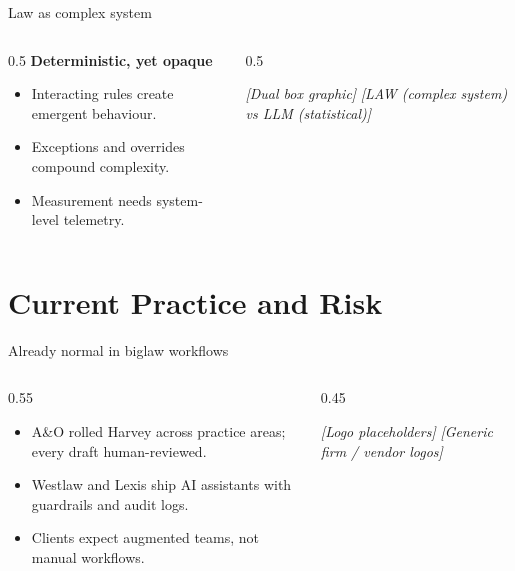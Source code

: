 \documentclass[10pt, aspectratio=169]{beamer}
\newcommand{\placeholder}[1]{\textit{[#1]}}
\begin{document}
\begin{frame}{Law as complex system}
  \begin{columns}[T]
    \begin{column}{0.5\textwidth}
      \textbf{Deterministic, yet opaque}
      \begin{itemize}
        \item Interacting rules create emergent behaviour.
        \item Exceptions and overrides compound complexity.
        \item Measurement needs system-level telemetry.
      \end{itemize}
    \end{column}
    \begin{column}{0.5\textwidth}
      \begin{block}{\placeholder{Dual box graphic}}
        \centering
        \placeholder{LAW (complex system) vs LLM (statistical)}
      \end{block}
    \end{column}
  \end{columns}
\end{frame}

\section{Current Practice and Risk}

\begin{frame}{Already normal in biglaw workflows}
  \begin{columns}[T]
    \begin{column}{0.55\textwidth}
      \begin{itemize}
        \item A\&O rolled Harvey across practice areas; every draft human-reviewed.
        \item Westlaw and Lexis ship AI assistants with guardrails and audit logs.
        \item Clients expect augmented teams, not manual workflows.
      \end{itemize}
    \end{column}
    \begin{column}{0.45\textwidth}
      \begin{block}{\placeholder{Logo placeholders}}
        \centering
        \placeholder{Generic firm / vendor logos}
      \end{block}
    \end{column}
  \end{columns}
  \vfill
  \small \parencite{reuters_harvey1,reuters_harvey2,tr_westlaw_launch,tr_cocounsel_integration}
\end{frame}
\end{document}
